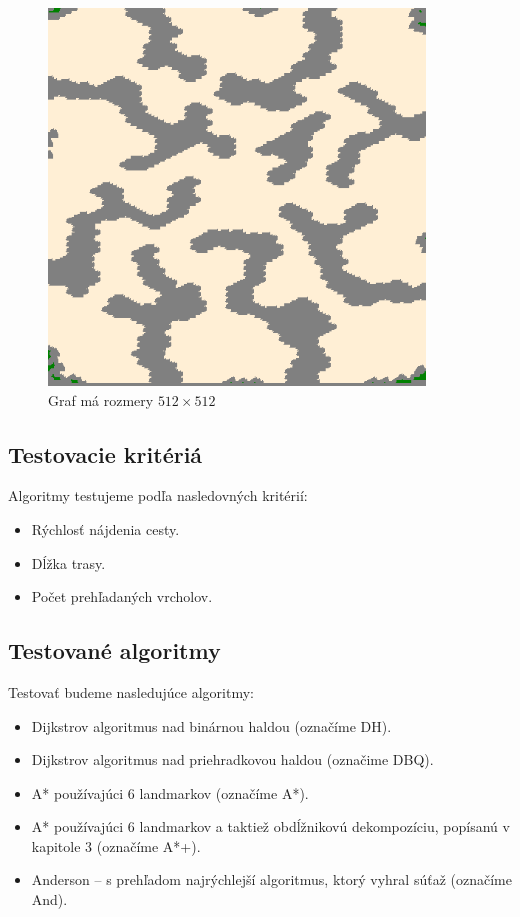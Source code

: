\begin{figure}[h]
\centering
\includegraphics[width=10cm]{./img/BigGameHunters.png}
\caption{Graf  má rozmery $512 \times 512$}
\label{fig:biggamehunters_map}
\end{figure}

\subsection{Testovacie kritériá}
Algoritmy testujeme podľa nasledovných kritérií:

\begin{itemize}
\item Rýchlosť nájdenia cesty.
\item Dĺžka trasy.
\item Počet prehľadaných vrcholov.
\end{itemize}


\subsection{Testované algoritmy}
Testovať budeme nasledujúce algoritmy:
\begin{itemize}
\item Dijkstrov algoritmus nad binárnou haldou (označíme DH).
\item Dijkstrov algoritmus nad priehradkovou haldou (označime DBQ).
\item A* používajúci 6 landmarkov (označíme A*).
\item A* používajúci 6 landmarkov a taktiež obdĺžnikovú dekompozíciu, popísanú v kapitole 3 (označíme A*+).
\item Anderson -- s prehľadom najrýchlejší algoritmus, ktorý vyhral súťaž (oz\-na\-čí\-me And).
\end{itemize}



